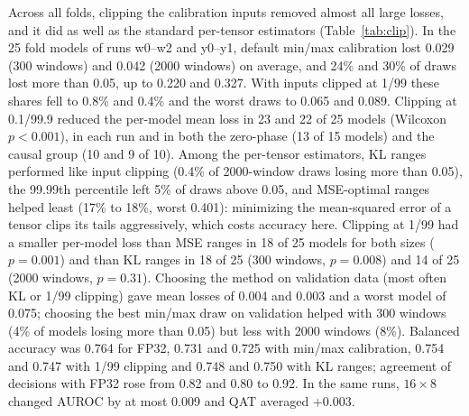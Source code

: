 \documentclass[preprint,12pt]{elsarticle}
\begin{document}
Across all folds, clipping the calibration inputs removed almost all large losses, and it did as well as the standard per-tensor estimators (Table~\ref{tab:clip}). In the 25 fold models of runs w0--w2 and y0--y1, default min/max calibration lost 0.029 (300 windows) and 0.042 (2000 windows) on average, and 24\% and 30\% of draws lost more than 0.05, up to 0.220 and 0.327. With inputs clipped at 1/99 these shares fell to 0.8\% and 0.4\% and the worst draws to 0.065 and 0.089. Clipping at 0.1/99.9 reduced the per-model mean loss in 23 and 22 of 25 models (Wilcoxon $p<0.001$), in each run and in both the zero-phase (13 of 15 models) and the causal group (10 and 9 of 10). Among the per-tensor estimators, KL ranges performed like input clipping (0.4\% of 2000-window draws losing more than 0.05), the 99.99th percentile left 5\% of draws above 0.05, and MSE-optimal ranges helped least (17\% to 18\%, worst 0.401): minimizing the mean-squared error of a tensor clips its tails aggressively, which costs accuracy here. Clipping at 1/99 had a smaller per-model loss than MSE ranges in 18 of 25 models for both sizes ($p=0.001$) and than KL ranges in 18 of 25 (300 windows, $p=0.008$) and 14 of 25 (2000 windows, $p=0.31$). Choosing the method on validation data (most often KL or 1/99 clipping) gave mean losses of 0.004 and 0.003 and a worst model of 0.075; choosing the best min/max draw on validation helped with 300 windows (4\% of models losing more than 0.05) but less with 2000 windows (8\%). Balanced accuracy was 0.764 for FP32, 0.731 and 0.725 with min/max calibration, 0.754 and 0.747 with 1/99 clipping and 0.748 and 0.750 with KL ranges; agreement of decisions with FP32 rose from 0.82 and 0.80 to 0.92. In the same runs, $16\times8$ changed AUROC by at most 0.009 and QAT averaged $+0.003$.
\end{document}

